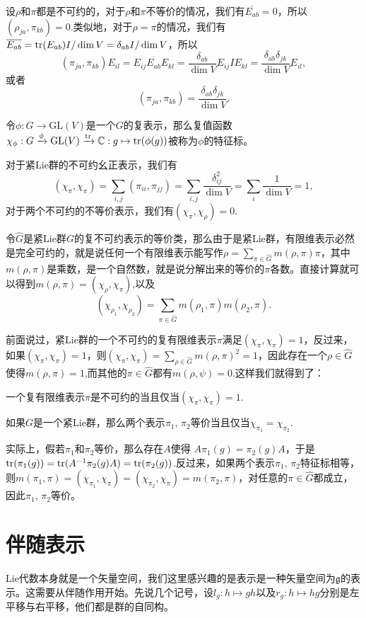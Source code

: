 \documentclass[9pt]{extarticle}
\newcommand{\cc}{\mathbb{C}}
\newcommand{\lag}{{\mathfrak{g}}}
\begin{document}
\para 设$\rho$和$\pi$都是不可约的，对于$\rho$和$\pi$不等价的情况，我们有$\overline{E_{ab}}=0$，所以$\left(\rho_{ja},\pi_{kb}\right)=0$.类似地，对于$\rho=\pi$的情况，我们有$\overline{E_{ab}}=\operatorname{tr}(E_{ab})I/\dim V=\delta_{ab}I/\dim V$，所以
\[
	\left(\pi_{ja},\pi_{kb}\right)E_{il}=E_{ij}\overline{E_{ab}}E_{kl}=\frac{\delta_{ab}}{\dim V}E_{ij}IE_{kl}=\frac{\delta_{ab}\delta_{jk}}{\dim V}E_{il},
\]
或者
\[
	\left(\pi_{ja},\pi_{kb}\right)=\frac{\delta_{ab}\delta_{jk}}{\dim V}.
\]

\para 令$\phi:G\to \mathrm{GL}(V)$是一个$G$的复表示，那么复值函数$\chi_\phi:G\xrightarrow{\phi}\mathrm{GL}(V)\xrightarrow{\tr}\cc:g\mapsto \tr(\phi(g))$被称为$\phi$的特征标。

对于紧Lie群的不可约幺正表示，我们有
\[
(\chi_\pi, \chi_\pi)=\sum_{i,j}(\pi_{ii},\pi_{jj})=\sum_{i,j}\frac{\delta_{ij}^2}{\dim V}=\sum_{i}\frac{1}{\dim V}=1,
\]
对于两个不可约的不等价表示，我们有$(\chi_\pi, \chi_\rho)=0$.

令$\hat{G}$是紧Lie群$G$的复不可约表示的等价类，那么由于是紧Lie群，有限维表示必然是完全可约的，就是说任何一个有限维表示能写作$\rho=\sum_{\pi\in\hat{G}}m(\rho,\pi)\pi$，其中$m(\rho,\pi)$是乘数，是一个自然数，就是说分解出来的等价的$\pi$各数。直接计算就可以得到$m(\rho,\pi)=(\chi_\rho,\chi_\pi)$,以及
\[
	(\chi_{\rho_1},\chi_{\rho_2})=\sum_{\pi\in\hat{G}}m(\rho_1,\pi)m(\rho_2,\pi).
\]

前面说过，紧Lie群的一个不可约的复有限维表示$\pi$满足$(\chi_\pi, \chi_\pi)=1$，反过来，如果$(\chi_\pi, \chi_\pi)=1$，则$(\chi_{\pi},\chi_{\pi})=\sum_{\rho\in\hat{G}}m(\rho,\pi)^2=1$，因此存在一个$\rho\in\hat{G}$使得$m(\rho,\pi)=1$,而其他的$\pi\in\hat{G}$都有$m(\rho,\psi)=0$.这样我们就得到了：

\para 一个复有限维表示$\pi$是不可约的当且仅当$(\chi_{\pi},\chi_{\pi})=1$.

\pro 如果$G$是一个紧Lie群，那么两个表示$\pi_1$, $\pi_2$等价当且仅当$\chi_{\pi_1}=\chi_{\pi_2}$.

实际上，假若$\pi_1$和$\pi_2$等价，那么存在$A$使得
$A\pi_1(g)=\pi_2(g)A$，于是$\operatorname{tr}(\pi_1(g))=\operatorname{tr}(A^{-1}\pi_2(g)A)=\operatorname{tr}(\pi_2(g))$.反过来，如果两个表示$\pi_1$, $\pi_2$特征标相等，则$	m(\pi_1,\pi)=(\chi_{\pi_1},\chi_\pi)=(\chi_{\pi_2},\chi_\pi)=m(\pi_2,\pi)$，对任意的$\pi\in\hat{G}$都成立，因此$\pi_1$, $\pi_2$等价。

\section{伴随表示}

Lie代数本身就是一个矢量空间，我们这里感兴趣的是表示是一种矢量空间为$\lag$的表示。这需要从伴随作用开始。先说几个记号，设$l_g:h\mapsto gh$以及$r_g:h\mapsto hg$分别是左平移与右平移，他们都是群的自同构。
\end{document}
